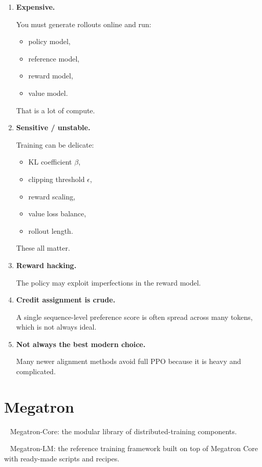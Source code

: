 \documentclass[11pt]{article}  %
\begin{document}
\begin{enumerate} 
  \item \textbf{Expensive.}

  You must generate rollouts online and run:
  \begin{itemize}
  \item policy model,
  \item reference model,
  \item reward model,
  \item value model.
  \end{itemize}
  That is a lot of compute.

  \item \textbf{Sensitive / unstable.}

  Training can be delicate:
  \begin{itemize}
  \item KL coefficient $\beta$,
  \item clipping threshold $\epsilon$,
  \item reward scaling,
  \item value loss balance,
  \item rollout length.
  \end{itemize}
  These all matter.

  \item \textbf{Reward hacking.}

  The policy may exploit imperfections in the reward model.

  \item \textbf{Credit assignment is crude.}

  A single sequence-level preference score is often spread across many tokens, which is not always ideal.

  \item \textbf{Not always the best modern choice.}

  Many newer alignment methods avoid full PPO because it is heavy and complicated.
\end{enumerate}


\section{Megatron}

\textbullet~ Megatron-Core: the modular library of distributed-training components.

\textbullet~ Megatron-LM: the reference training framework built on top of Megatron Core with ready-made scripts and recipes.
\end{document}
